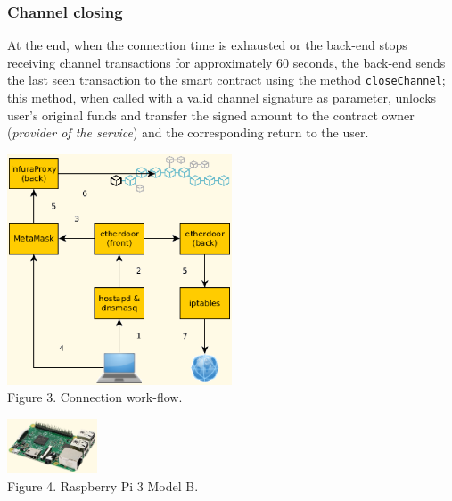\documentclass[12pt]{amsart}
\begin{document}
\begin{multicols}{2}
\subsubsection{Channel closing}
At the end, when the connection time is exhausted or the back-end
stops receiving channel transactions for approximately 60 seconds,
the back-end sends the last seen transaction to the smart contract
using the method \texttt{closeChannel}; this method, when called
with a valid channel signature as parameter, unlocks user's original
funds and transfer the signed amount to the contract owner
(\textit{provider of the service}) and the corresponding return
to the user.

\begin{center}
  \includegraphics[keepaspectratio, width=0.5\textwidth]{images/con-flow-y.eps}
\\
Figure 3. Connection work-flow.
\\
\end{center}

\begin{center}
  \includegraphics[keepaspectratio, width=0.2\textwidth]{images/rpi3modelb-sourceamazon.eps}
\\
Figure 4. Raspberry Pi 3 Model B\cite{RaspberryPi19}.
\\
\end{center}


\end{multicols}
\end{document}
